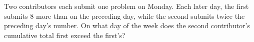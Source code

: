 Two contributors each submit one problem on Monday. Each later day, the first submits 8 more than on the preceding day, while the second submits twice the preceding day's number. On what day of the week does the second contributor's cumulative total first exceed the first's?
